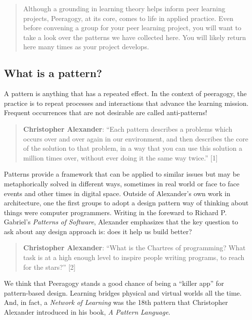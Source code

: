 \begin{quote}
Although a grounding in learning theory helps inform peer learning
projects, Peeragogy, at its core, comes to life in applied practice.
Even before convening a group for your peer learning project, you will
want to take a look over the patterns we have collected here. You will
likely return here many times as your project develops.

\end{quote}
\subsection{What is a pattern?}

A pattern is anything that has a repeated effect. In the context of
peeragogy, the practice is to repeat processes and interactions that
advance the learning mission. Frequent occurrences that are not
desirable are called anti-patterns!

\begin{quote}
\textbf{Christopher Alexander}: ``Each pattern describes a problems
which occurs over and over again in our environment, and then describes
the core of the solution to that problem, in a way that you can use this
solution a million times over, without ever doing it the same way
twice.'' {[}1{]}

\end{quote}
Patterns provide a framework that can be applied to similar issues but
may be metaphorically solved in different ways, sometimes in real world
or face to face events and other times in digital space. Outside of
Alexander's own work in architecture, one the first groups to adopt a
design pattern way of thinking about things were computer programmers.
Writing in the foreward to Richard P. Gabriel's \emph{Patterns of
Software}, Alexander emphasizes that the key question to ask about any
design approach is: does it help us build better?

\begin{quote}
\textbf{Christopher Alexander}: ``What is the Chartres of programming?
What task is at a high enough level to inspire people writing programs,
to reach for the stars?'' {[}2{]}

\end{quote}
We think that Peeragogy stands a good chance of being a ``killer app''
for pattern-based design. Learning bridges physical and virtual worlds
all the time. And, in fact, a \emph{Network of Learning} was the 18th
pattern that Christopher Alexander introduced in his book, \emph{A
Pattern Language}.

